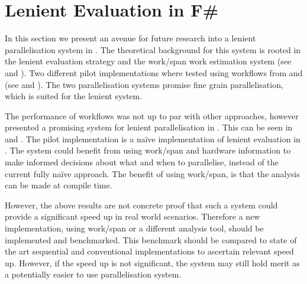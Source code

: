 \section{Lenient Evaluation in F\#}
In this section we present an avenue for future research into a lenient parallelisation system in \fs. The theoretical background for this system is rooted in the lenient evaluation strategy and the work/span work estimation system (see  and ). Two different pilot implementations where tested using  workflows from \fs and    (see  and ). The two parallelisation systems promise fine grain parallelisation, which is suited for the lenient system.

The performance of  workflows was not up to par with other approaches, however  presented a promising system for lenient parallelisation in \fs. This can be seen in  and . The pilot implementation is a naïve implementation of lenient evaluation in \fs. The system could benefit from using work/span and hardware information to make informed decisions about what and when to parallelise, instead of the current fully naïve approach. The benefit of using work/span, is that the analysis can be made at compile time.

However, the above results are not concrete proof that such a system could provide a significant speed up in real world scenarios. Therefore a new implementation, using work/span or a different analysis tool, should be implemented and benchmarked. This benchmark should be compared to state of the art sequential and conventional implementations to  ascertain relevant speed up. However, if the speed up is not significant, the system may still hold merit as a potentially easier to use parallelisation system.
